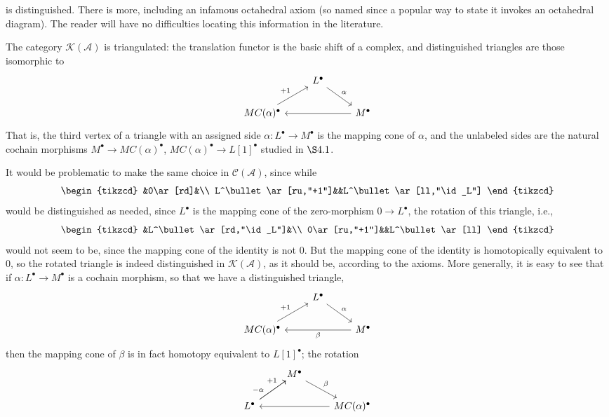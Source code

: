 is distinguished. There is more, including an infamous octahedral axiom (so named since a popular way to state it invokes an octahedral diagram). The reader will have no difficulties locating this information in the literature.\par
The category $\mathcal{K}(\mathcal{A})$ is triangulated: the translation functor is the basic shift of a complex, and distinguished triangles are those isomorphic to
\[\begin{tikzcd}
&L^\bullet\ar[rd,"\alpha"]&\\
MC(\alpha)^\bullet\ar[ru,"+1"]&&M^\bullet\ar[ll]
\end{tikzcd}\]
That is, the third vertex of a triangle with an assigned side $\alpha:L^\bullet\to M^\bullet$ is the mapping cone of $\alpha$, and the unlabeled sides are the natural cochain morphisms $M^\bullet\to MC(\alpha)^\bullet$, $MC(\alpha)^\bullet\to L[1]^\bullet$ studied in $\S4.1$.\par
It would be problematic to make the same choice in $\mathcal{C}(\mathcal{A})$, since while
\[\begin{tikzcd}
&0\ar[rd]&\\
L^\bullet\ar[ru,"+1"]&&L^\bullet\ar[ll,"\id_L"]
\end{tikzcd}\]
would be distinguished as needed, since $L^\bullet$ is the mapping cone of the zero-morphism $0\to L^\bullet$, the rotation of this triangle, i.e.,
\[\begin{tikzcd}
&L^\bullet\ar[rd,"\id_L"]&\\
0\ar[ru,"+1"]&&L^\bullet\ar[ll]
\end{tikzcd}\]
would not seem to be, since the mapping cone of the identity is not $0$. But the mapping cone of the identity is homotopically equivalent to $0$, so the rotated triangle is indeed distinguished in $\mathcal{K}(\mathcal{A})$, as it should be, according to the axioms. More generally, it is easy to see that if $\alpha:L^\bullet\to M^\bullet$ is a cochain morphism, so that we have a distinguished triangle,
\[\begin{tikzcd}
&L^\bullet\ar[rd,"\alpha"]&\\
MC(\alpha)^\bullet\ar[ru,"+1"]&&M^\bullet\ar[ll,"\beta"]
\end{tikzcd}\]
then the mapping cone of $\beta$ is in fact homotopy equivalent to $L[1]^\bullet$; the rotation
\[\begin{tikzcd}
&M^\bullet\ar[rd,"\beta"]&\\
L^\bullet\ar[ru,near end,"+1"]\ar[ru,near start,"-\alpha"]&&MC(\alpha)^\bullet\ar[ll]
\end{tikzcd}\]
